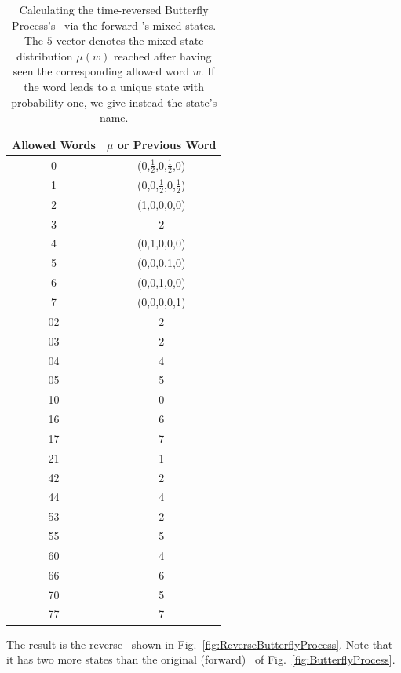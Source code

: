 \begin{table}[th]
\begin{center}
\begin{tabular}{|c|c|}
\hline
Allowed Words & $\mu$ or Previous Word\\
\hline
0 & (0,$\frac{1}{2}$,0,$\frac{1}{2}$,0)\\
1 & (0,0,$\frac{1}{2}$,0,$\frac{1}{2}$)\\
2 & (1,0,0,0,0)\\
3 & 2\\
4 & (0,1,0,0,0)\\
5 & (0,0,0,1,0)\\
6 & (0,0,1,0,0)\\
7 & (0,0,0,0,1)\\
02 & 2\\
03 & 2\\
04 & 4\\
05 & 5\\
10 & 0\\
16 & 6\\
17 & 7\\
21 & 1\\
42 & 2\\
44 & 4\\
53 & 2\\
55 & 5\\
60 & 4\\
66 & 6\\
70 & 5\\
77 & 7\\
\hline
\end{tabular}
\end{center}
\caption{Calculating the time-reversed Butterfly Process's \eM\ via the forward
  \eM's mixed states. The $5$-vector denotes the mixed-state distribution
  $\mu(w)$ reached after having seen the corresponding allowed word $w$. If
  the word leads to a unique state with probability one, we give instead the
  state's name.
  }
\label{tab:ButterflyProcessMixedStates}
\end{table}

The result is the reverse \eM\ shown in Fig.~\ref{fig:ReverseButterflyProcess}.
Note that it has two more states than the original (forward) \eM\ of
Fig.~\ref{fig:ButterflyProcess}.

